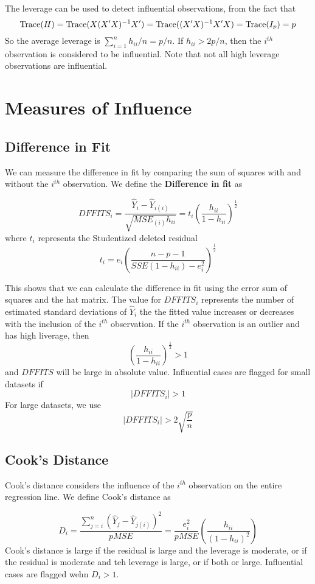 The leverage can be used to detect influential observations, from the fact that 
    \[\operatorname{Trace}(H) = \operatorname{Trace}(X(X'X)^{-1}X') = \operatorname{Trace}((X'X)^{-1}X'X) = \operatorname{Trace}(I_p) = p\]
    So the average leverage is $\sum_{i=1}^n h_{ii}/n = p/n$. If $h_{ii} > 2p/n$, then the $i^{th}$ observation is considered to be influential. Note that not all high leverage observations are influential.


\section{Measures of Influence}

\subsection{Difference in Fit}

We can measure the difference in fit by comparing the sum of squares with and without the $i^{th}$ observation. We define the \textbf{Difference in fit} as

\[DFFITS_i = \frac{\hat{Y}_i - \hat{Y}_{i(i)}}{\sqrt{MSE_{(i)}h_{ii}}} = t_i \left(\frac{h_{ii}}{1-h_{ii}}\right)^{\frac{1}{2}}\]
where $t_i$ represents the Studentized deleted residual 
\[t_i = e_i\left(\frac{n-p-1}{SSE(1-h_{ii})-e_i^2}\right)^{\frac{1}{2}}\]

This shows that we can calculate the difference in fit using the error sum of squares and the hat matrix. The value for $DFFITS_i$  represents the number of estimated standard deviations of $\hat{Y}_i$ the the fitted value increases or decreases with the inclusion of the $i^{th}$ observation. If the $i^{th}$ observation is an outlier and has high liverage, then 
\[\left(\frac{h_{ii}}{1-h_{ii}}\right)^{\frac{1}{2}} > 1\]
and $DFFITS$ will be large in absolute value. Influential cases are flagged for small datasets if 
\[|DFFITS_i| > 1\]
For large datasets, we use 
\[|DFFITS_i| > 2\sqrt{\frac{p}{n}}\]

\subsection{Cook's Distance}

Cook's distance considers the influence of the $i^{th}$ observation on the entire regression line. We define Cook's distance as

\[D_i = \frac{\sum_{j=i}^n(\hat{Y}_j - \hat{Y}_{j(i)})^2}{pMSE} = \frac{e_i^2}{pMSE}\left(\frac{h_{ii}}{(1-h_{ii})^2}\right)\]
Cook's distance is large if the residual is large and the leverage is moderate, or if the residual is moderate and teh leverage is large, or if both or large. Influential cases are flagged wehn $D_i > 1$. 

